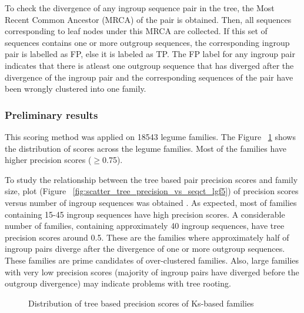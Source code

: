 \documentclass{article}
\begin{document}
		To check the divergence of any ingroup sequence pair in the tree, the Most Recent Common Ancestor (MRCA) of the pair is obtained. Then, all sequences corresponding to leaf nodes under this MRCA are collected. If this set of sequences contains one or more outgroup sequences, the corresponding ingroup pair is labelled as FP, else it is labeled as TP. The FP label for any ingroup pair indicates that there is atleast one outgroup sequence that has diverged after the divergence of the ingroup pair and the corresponding sequences of the pair have been wrongly clustered into one family. 
		
		\subsubsection{Preliminary results}
		This scoring method was applied on 18543 legume families. The Figure ~\ref{fig:hist_tree_precision_scores_lgf5} shows the distribution of scores across the legume families. Most of the families have higher precision scores ($\geq$0.75).
		
		To study the relationship between the tree based pair precision scores and family size, plot (Figure ~\ref{fig:scatter_tree_precision_vs_seqct_lgf5}) of precision scores versus number of ingroup sequences was obtained . As expected, most of families containing 15-45 ingroup sequences  have high precision scores. A considerable number of families, containing approximately 40 ingroup sequences, have tree precision scores around 0.5. These are the families where approximately half of ingroup pairs diverge after the divergence of one or more outgroup sequences. These families are prime candidates of over-clustered families. Also, large families with very low precision scores (majority of ingroup pairs have diverged before the outgroup divergence) may indicate problems with tree rooting.
		
		
		\begin{figure}[h!]
			\caption{Distribution of tree based precision scores of Ks-based families}
			\label{fig:hist_tree_precision_scores_lgf5}
		\end{figure}
		
\end{document}
